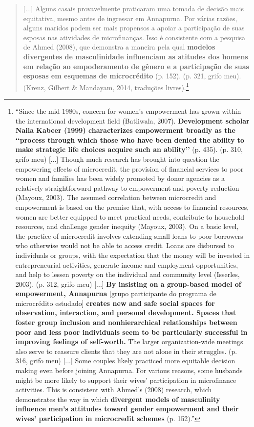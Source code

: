 \begin{quote}
    [...] Alguns casais provavelmente praticaram uma tomada de decisão mais equitativa, mesmo antes de ingressar em Annapurna. Por várias razões, alguns maridos podem ser mais propensos a apoiar a participação de suas esposas nas atividades de microfinanças. Isso é consistente com a pesquisa de Ahmed (2008), que demonstra a maneira pela qual \textbf{modelos divergentes de masculinidade influenciam as atitudes dos homens em relação ao empoderamento de gênero e a participação de suas esposas em esquemas de microcrédito} (p. 152). (p. 321, grifo meu). (Krenz, Gilbert \& Mandayam, 2014, traduções livres).\footnote{“Since the mid-1980s, concern for women’s empowerment has grown within the international development field (Batliwala, 2007). \textbf{Development scholar Naila Kabeer (1999) characterizes empowerment broadly as the ‘‘process through which those who have been denied the ability to make strategic life choices acquire such an ability’’} (p. 435). (p. 310, grifo meu) [...] Though much research has brought into question the empowering effects of microcredit, the provision of financial services to poor women and families has been widely promoted by donor agencies as a relatively straightforward pathway to empowerment and poverty reduction (Mayoux, 2003). The assumed correlation between microcredit and empowerment is based on the premise that, with access to financial resources, women are better equipped to meet practical needs, contribute to household resources, and challenge gender inequity (Mayoux, 2003). On a basic level, the practice of microcredit involves extending small loans to poor borrowers who otherwise would not be able to access credit. Loans are disbursed to individuals or groups, with the expectation that the money will be invested in entrepreneurial activities, generate income and employment opportunities, and help to lessen poverty on the individual and community level (Isserles, 2003). (p. 312, grifo meu) [...] \textbf{By insisting on a group-based model of empowerment, Annapurna} [grupo participante do programa de microcrédito estudado] \textbf{creates new and safe social spaces for observation, interaction, and personal development. Spaces that foster group inclusion and nonhierarchical relationships between poor and less poor individuals seem to be particularly successful in improving feelings of self-worth.} The larger organization-wide meetings also serve to reassure clients that they are not alone in their struggles. (p. 316, grifo meu) [...] Some couples likely practiced more equitable decision making even before joining Annapurna. For various reasons, some husbands might be more likely to support their wives’ participation in microfinance activities. This is consistent with Ahmed’s (2008) research, which demonstrates the way in which \textbf{divergent models of masculinity influence men’s attitudes toward gender empowerment and their wives’ participation in microcredit schemes} (p. 152).”} 
\end{quote}

